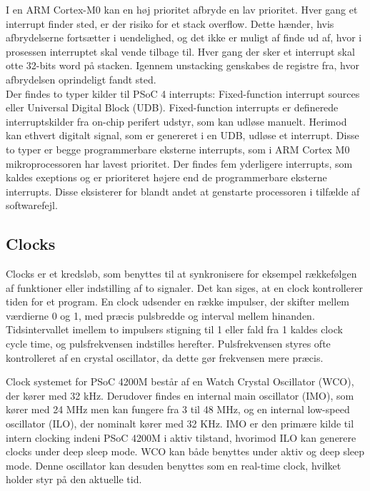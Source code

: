I en ARM Cortex-M0 kan en høj prioritet afbryde en lav prioritet. Hver gang et interrupt finder sted, er der risiko for et stack overflow. Dette hænder, hvis afbrydelserne fortsætter i uendelighed, og det ikke er muligt af finde ud af, hvor i prosessen interruptet skal vende tilbage til. Hver gang der sker et interrupt skal otte 32-bits word på stacken. Igennem unstacking genskabes de registre fra, hvor afbrydelsen oprindeligt fandt sted.\\
Der findes to typer kilder til PSoC 4 interrupts: Fixed-function interrupt sources eller Universal Digital Block (UDB). Fixed-function interrupts er definerede interruptskilder fra on-chip perifert udstyr, som kan udløse manuelt. Herimod kan ethvert digitalt signal, som er genereret i en UDB, udløse et interrupt. Disse to typer er begge programmerbare eksterne interrupts, som i ARM Cortex M0 mikroprocessoren har lavest prioritet. Der findes fem yderligere interrupts, som kaldes exeptions og er prioriteret højere end de programmerbare eksterne interrupts. Disse eksisterer for blandt andet at genstarte processoren i tilfælde af softwarefejl. \citep{Badiger2016}

\subsection{Clocks}
Clocks er et kredsløb, som benyttes til at synkronisere for eksempel rækkefølgen af funktioner eller indstilling af to signaler. Det kan siges, at en clock kontrollerer tiden for et program. En clock udsender en række impulser, der skifter mellem værdierne 0 og 1, med præcis pulsbredde og interval mellem hinanden. Tidsintervallet imellem to impulsers stigning til 1 eller fald fra 1 kaldes clock cycle time, og pulsfrekvensen indstilles herefter. Pulsfrekvensen styres ofte kontrolleret af en crystal oscillator, da dette gør frekvensen mere præcis. \citep{Tanenbaum2006}

Clock systemet for PSoC 4200M består af en Watch Crystal Oscillator (WCO), der kører med 32 kHz. Derudover findes en internal main oscillator (IMO), som kører med 24 MHz men kan fungere fra 3 til 48 MHz, og en internal low-speed oscillator (ILO), der nominalt kører med 32 KHz. IMO er den primære kilde til intern clocking indeni PSoC 4200M i aktiv tilstand, hvorimod ILO kan generere clocks under deep sleep mode. WCO kan både benyttes under aktiv og deep sleep mode. Denne oscillator kan desuden benyttes som en real-time clock, hvilket holder styr på den aktuelle tid. \citep{Semiconductor20164200M}
